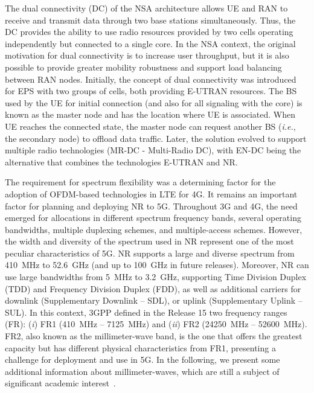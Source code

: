 The dual connectivity (DC) of the NSA architecture allows UE and RAN to receive and transmit data through two base stations simultaneously. Thus, the DC provides the ability to use radio resources provided by two cells operating independently but connected to a single core. In the NSA context, the original motivation for dual connectivity is to increase user throughput, but it is also possible to provide greater mobility robustness and support load balancing between RAN nodes. Initially, the concept of dual connectivity was introduced for EPS with two groups of cells, both providing E-UTRAN resources. The BS used by the UE for initial connection (and also for all signaling with the core) is known as the master node and has the location where UE is associated. When UE reaches the connected state, the master node can request another BS (\textit{i.e.}, the secondary node) to offload data traffic. Later, the solution evolved to support multiple radio technologies (MR-DC - Multi-Radio DC), with EN-DC being the alternative that combines the technologies E-UTRAN and NR.

The requirement for spectrum flexibility was a determining factor for the adoption of OFDM-based technologies in LTE for 4G. It remains an important factor for planning and deploying NR to 5G. Throughout 3G and 4G, the need emerged for allocations in different spectrum frequency bands, several operating bandwidths, multiple duplexing schemes, and multiple-access schemes. However, the width and diversity of the spectrum used in NR represent one of the most peculiar characteristics of 5G. NR supports a large and diverse spectrum from 410~MHz to 52.6~GHz (and up to 100~GHz in future releases). Moreover, NR can use large bandwidths from 5~MHz to 3.2~GHz, supporting Time Division Duplex (TDD) and Frequency Division Duplex (FDD), as well as additional carriers for downlink (Supplementary Downlink -- SDL), or uplink (Supplementary Uplink -- SUL). In this context, 3GPP defined in the Release 15 two frequency ranges (FR): (\textit{i}) FR1 (410~MHz -- 7125~MHz) and (\textit{ii}) FR2 (24250~MHz -- 52600~MHz). FR2, also known as the millimeter-wave band, is the one that offers the greatest capacity but has different physical characteristics from FR1, presenting a challenge for deployment and use in 5G. In the following, we present some additional information about millimeter-waves, which are still a subject of significant academic interest~\cite{rangan:14, wang:18}.

